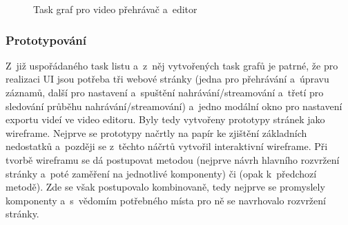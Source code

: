 \documentclass[thesis=M,czech]{FITthesis}[2012/06/26]
\begin{document}
\begin{figure}[h]\centering
	\caption{Task graf pro video přehrávač a~editor}\label{img:navrh_frontend_ui_taskgraf_2}
\end{figure}

\subsubsection{Prototypování} \label{subsubsec:navrh_frontend_ui_proto}
Z~již uspořádaného task listu a~z~něj vytvořených task grafů je patrné, že pro realizaci UI jsou potřeba tři webové stránky (jedna pro přehrávání a~úpravu záznamů, další pro nastavení a~spuštění nahrávání/streamování a~třetí pro sledování průběhu nahrávání/streamování) a~jedno modální okno pro nastavení exportu videí ve video editoru. Byly tedy vytvořeny prototypy stránek jako wireframe. Nejprve se prototypy načrtly na papír ke zjištění základních nedostatků a~později se z~těchto náčrtů vytvořil interaktivní wireframe. Při tvorbě wireframu se dá postupovat metodou  (nejprve návrh hlavního rozvržení stránky a~poté zaměření na jednotlivé komponenty) či  (opak k~předchozí metodě). Zde se však postupovalo kombinovaně, tedy nejprve se promyslely komponenty a~s~vědomím potřebného místa pro ně se navrhovalo rozvržení stránky. 
\end{document}
